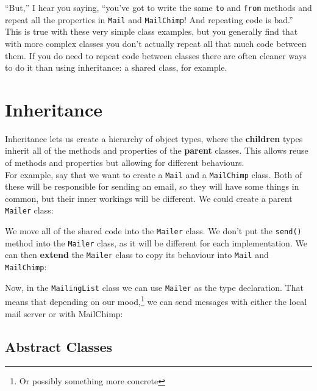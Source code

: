 ``But,'' I hear you saying, ``you've got to write the same \texttt{to} and \texttt{from} methods and repeat all the properties in \texttt{Mail} and \texttt{MailChimp}! And repeating code is bad.''
\\

This is true with these very simple class examples, but you generally find that with more complex classes you don't actually repeat all that much code between them. If you do need to repeat code between classes there are often cleaner ways to do it than using inheritance: a shared class, for example.




\section{Inheritance}

Inheritance lets us create a hierarchy of object types, where the \textbf{children} types inherit all of the methods and properties of the \textbf{parent} classes. This allows reuse of methods and properties but allowing for different behaviours.
\\

For example, say that we want to create a \texttt{Mail} and a \texttt{MailChimp} class. Both of these will be responsible for sending an email, so they will have some things in common, but their inner workings will be different. We could create a parent \texttt{Mailer} class:


We move all of the shared code into the \texttt{Mailer} class. We don't put the \texttt{send()} method into the \texttt{Mailer} class, as it will be different for each implementation. We can then \textbf{extend} the \texttt{Mailer} class to copy its behaviour into \texttt{Mail} and \texttt{MailChimp}:


Now, in the \texttt{MailingList} class we can use \texttt{Mailer} as the type declaration. That means that depending on our mood,\footnote{Or possibly something more concrete} we can send messages with either the local mail server or with MailChimp:



\subsection{Abstract Classes}

